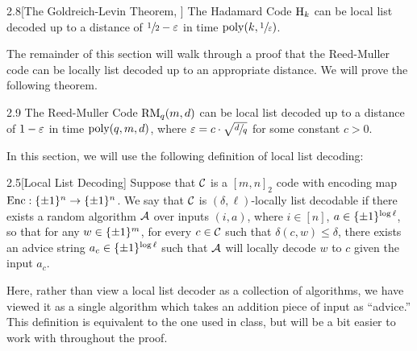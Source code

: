 \documentclass[11pt]{article}
\begin{document}
\begin{theorem}{2.8}[The Goldreich-Levin Theorem, \cite{goldreichlevin}] \label{t-2-8}
    The Hadamard Code $\mathrm{H}_k$ can be local list decoded up to a distance of $\sfrac{1}{2} - \varepsilon$ in time $\mathrm{poly}(k, \sfrac{1}{\varepsilon})$.
\end{theorem}

The remainder of this section will walk through a proof that the Reed-Muller code can be locally list decoded up to an appropriate distance. We will prove the following theorem.

\begin{theorem}{2.9} \label{t-2-9}
    The Reed-Muller Code $\mathrm{RM}_q(m, d)$ can be local list decoded up to a distance of $1 - \varepsilon$ in time $\mathrm{poly}(q, m, d)$, where $\varepsilon = c \cdot \sqrt{\sfrac{d}{q}}$ for some constant $c > 0$.
\end{theorem}

In this section, we will use the following definition of local list decoding:

\begin{definition}{2.5}[Local List Decoding]
    Suppose that $\mathcal{C}$ is a $[m, n]_2$ code with encoding map $\mathrm{Enc} : \{\pm 1\}^{n} \rightarrow \{\pm 1\}^n$. We say that $\mathcal{C}$ is $(\delta, \ell)$-locally list decodable if there exists a random algorithm $\mathcal{A}$ over inputs $(i, a)$, where $i \in [n]$, $a \in \{\pm 1\}^{\log \ell}$, so that for any $w \in \{\pm 1\}^m$, for every $c \in \mathcal{C}$ such that $\delta(c, w) \leq \delta$, there exists an advice string $a_c \in \{\pm 1\}^{\log \ell}$ such that $\mathcal{A}$ will locally decode $w$ to $c$ given the input $a_c$.
\end{definition}

Here, rather than view a local list decoder as a collection of algorithms, we have viewed it as a single algorithm which takes an addition piece of input as ``advice.'' This definition is equivalent to the one used in class, but will be a bit easier to work with throughout the proof.
\end{document}
